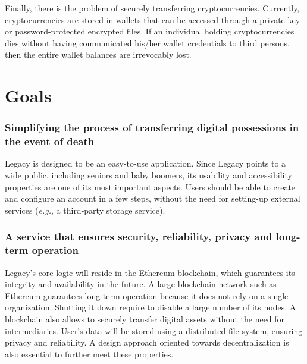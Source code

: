 Finally, there is the problem of securely transferring cryptocurrencies. Currently, cryptocurrencies are stored in wallets that can be accessed through a private key or password-protected encrypted files. If an individual holding cryptocurrencies dies without having communicated his/her wallet credentials to third persons, then the entire wallet balances are irrevocably lost. 


\section{Goals} %
\label{sec:goals}

\subsubsection*{Simplifying the process of transferring digital possessions in the event of death} %
\label{ssub:simplifying_the_process_of_transferring_your_digital_possessions_after_your_death}
Legacy is designed to be an easy-to-use application. 
Since Legacy points to a wide public, including seniors and baby boomers, its usability and accessibility properties are one of its most important aspects.
Users should be able to create and configure an account in a few steps, without the need for setting-up external services (\textit{e.g.}, a third-party storage service). 

\subsubsection*{A service that ensures security, reliability, privacy and long-term operation} %
\label{ssub:a_service_that_ensures_security_reliability_privacy_and_long_term_operation}
Legacy's core logic will reside in the Ethereum blockchain, which guarantees its integrity and availability in the future. 
A large blockchain network such as Ethereum guarantees long-term operation because it does not rely on a single organization. Shutting it down require to disable a large number of its nodes.
A blockchain also allows to securely transfer digital assets without the need for intermediaries.
User's data will be stored using a distributed file system, ensuring privacy and reliability.
A design approach oriented towards decentralization is also essential to further meet these properties.

